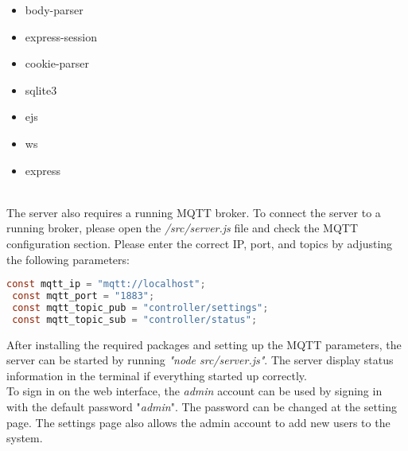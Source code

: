 \begin{minipage}[t]{.1\textwidth} 
\end{minipage}%
\begin{minipage}[t]{.25\textwidth}
    \begin{itemize}\itemsep0pt
        \item body-parser
        \item express-session
    \end{itemize}   
\end{minipage}%
\begin{minipage}[t]{.25\textwidth}
        \begin{itemize}\itemsep0pt
        \item cookie-parser
        \item sqlite3
    \end{itemize}
\end{minipage}%
\begin{minipage}[t]{.15\textwidth}
        \begin{itemize}\itemsep0pt
        \item ejs
        \item ws
    \end{itemize}
\end{minipage}%
\begin{minipage}[t]{.25\textwidth}
        \begin{itemize}\itemsep0pt
        \item express
    \end{itemize}
\end{minipage}%
\\

The server also requires a running MQTT broker. To connect the server to a running broker, please open the \textit{/src/server.js} file and check the MQTT configuration section. Please enter the correct IP, port, and topics by adjusting the following parameters:

\begin{lstlisting}[language = Java, numbers = none]
 const mqtt_ip = "mqtt://localhost";
 const mqtt_port = "1883";
 const mqtt_topic_pub = "controller/settings";
 const mqtt_topic_sub = "controller/status";
\end{lstlisting}

After installing the required packages and setting up the MQTT parameters, the server can be started by running \textit{"node src/server.js"}. The server display status information in the terminal if everything started up correctly.\\

To sign in on the web interface, the \textit{admin} account can be used by signing in with the default password "\textit{admin}". The password can be changed at the setting page. The settings page also allows the admin account to add new users to the system.